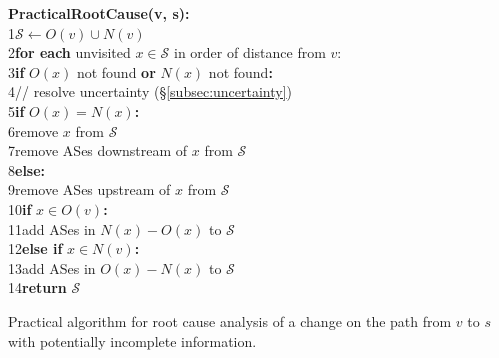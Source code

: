 
\begin{pseudocode}[t]
\textbf{PracticalRootCause(v, s):}\\
%
{\scriptsize 1}\hspace*{1em}$\mathcal{S} \leftarrow O(v) \cup N(v)$\\
{\scriptsize 2}\hspace*{1em}\textbf{for each} unvisited $x \in 
\mathcal{S}$ in order of distance from $v$:\\
%
{\scriptsize 3}\hspace*{2em}\textbf{if} $O(x)$ not found \textbf{or}
$N(x)$ not found\textbf{:} \\
{\scriptsize 4}\hspace*{4em}// resolve uncertainty (\S\ref{subsec:uncertainty})\\
%
{\scriptsize 5}\hspace*{2em}\textbf{if} $O(x) = N(x)$\textbf{:} \\
{\scriptsize 6}\hspace*{4em}remove $x$ from $\mathcal{S}$ \\
{\scriptsize 7}\hspace*{4em}remove ASes downstream of $x$ from $\mathcal{S}$ \\
%
{\scriptsize 8}\hspace*{2em}\textbf{else:} \\
{\scriptsize 9}\hspace*{4em}remove ASes upstream of $x$ from $\mathcal{S}$\\
{\scriptsize 10}\hspace*{3.7em}\textbf{if} $x \in O(v)$\textbf{:}  \\
{\scriptsize 11}\hspace*{5.7em}add ASes in $N(x) - O(x)$ to $\mathcal{S}$ \\
{\scriptsize 12}\hspace*{3.7em}\textbf{else if} $x \in N(v)$\textbf{:} \\
{\scriptsize 13}\hspace*{5.7em}add ASes in $O(x) - N(x)$ to $\mathcal{S}$\\
{\scriptsize 14}\hspace*{0.7em}\textbf{return} $\mathcal{S}$
%
\caption{Practical algorithm for root cause analysis of a change on the
path from $v$ to $s$ with potentially incomplete information.}
\label{algo:practical}
\end{pseudocode}

